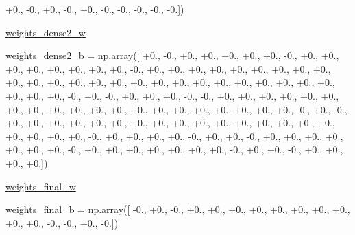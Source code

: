 \begin{DoxyCompactItemize}
+0., -\/0., +0., -\/0., +0., -\/0., -\/0., -\/0., -\/0., -\/0.\mbox{]})
\item 
\hyperlink{namespacepybullet-gym_1_1pybulletgym_1_1examples_1_1roboschool-weights_1_1enjoy___t_f___humanoid_py_bullet_env__v0__2017may_acdf32c3f558a216bcd46e24271251d8a}{weights\+\_\+dense2\+\_\+w}
\item 
\hyperlink{namespacepybullet-gym_1_1pybulletgym_1_1examples_1_1roboschool-weights_1_1enjoy___t_f___humanoid_py_bullet_env__v0__2017may_a5ac69262ed55249b8b650e8d347d8a13}{weights\+\_\+dense2\+\_\+b} = np.\+array(\mbox{[} +0., -\/0., +0., +0., +0., +0., +0., -\/0., +0., +0., +0., +0., +0., +0., +0., +0., -\/0., +0., +0., +0., +0., +0., +0., +0., +0., +0., +0., +0., +0., +0., +0., +0., +0., +0., +0., +0., +0., +0., +0., +0., +0., +0., +0., +0., +0., -\/0., +0., -\/0., +0., +0., +0., -\/0., -\/0., +0., +0., +0., +0., +0., +0., +0., +0., +0., +0., +0., +0., +0., +0., +0., +0., +0., +0., +0., +0., -\/0., +0., -\/0., +0., +0., +0., +0., +0., +0., +0., +0., +0., +0., +0., +0., +0., +0., +0., +0., +0., +0., +0., +0., -\/0., +0., +0., +0., +0., -\/0., +0., +0., -\/0., +0., +0., +0., +0., +0., +0., +0., -\/0., +0., +0., +0., +0., +0., +0., +0., -\/0., +0., +0., -\/0., +0., +0., +0., +0.\mbox{]})
\item 
\hyperlink{namespacepybullet-gym_1_1pybulletgym_1_1examples_1_1roboschool-weights_1_1enjoy___t_f___humanoid_py_bullet_env__v0__2017may_ae2c09e3b55cb98155274e8d7a39d91a3}{weights\+\_\+final\+\_\+w}
\item 
\hyperlink{namespacepybullet-gym_1_1pybulletgym_1_1examples_1_1roboschool-weights_1_1enjoy___t_f___humanoid_py_bullet_env__v0__2017may_adc1024ac18478ec0d3c79b350ca6f590}{weights\+\_\+final\+\_\+b} = np.\+array(\mbox{[} -\/0., +0., -\/0., +0., +0., +0., +0., +0., +0., +0., +0., +0., +0., -\/0., -\/0., +0., -\/0.\mbox{]})
\end{DoxyCompactItemize}


